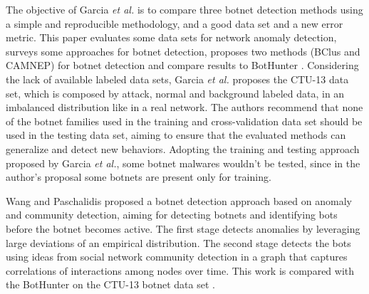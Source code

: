 \documentclass[review]{elsarticle}
\begin{document}
The objective of Garcia \emph{et al.} \cite{garcia2014empirical} is to compare three botnet detection methods using a simple and reproducible methodology, and a good data set and a new error metric. This paper evaluates some data sets for network anomaly detection, surveys some approaches for botnet detection, proposes two methods (BClus and CAMNEP) for botnet detection and compare results to BotHunter \cite{gu2007bothunter}. Considering the lack of available labeled data sets, Garcia \emph{et al.} \cite{garcia2014empirical} proposes the CTU-13 data set, which is composed by attack, normal and background labeled data, in an imbalanced distribution like in a real network. The authors recommend that none of the botnet families used in the training and cross-validation data set should be used in the testing data set, aiming to ensure that the evaluated methods can generalize and detect new behaviors. Adopting the training and testing approach proposed by Garcia \emph{et al.}, some botnet malwares wouldn't be tested, since in the author's proposal some botnets are present only for training. 

Wang and Paschalidis \cite{wang2017botnet} proposed a botnet detection approach based on anomaly and community detection, aiming for detecting botnets and identifying bots before the botnet becomes active. The first stage detects anomalies by leveraging large deviations of an empirical distribution. The second stage detects the bots using ideas from social network community detection in a graph that captures correlations of interactions among nodes over time. This work is compared with the BotHunter \cite{gu2007bothunter} on the CTU-13 botnet data set \cite{garcia2014empirical}.

\end{document}

